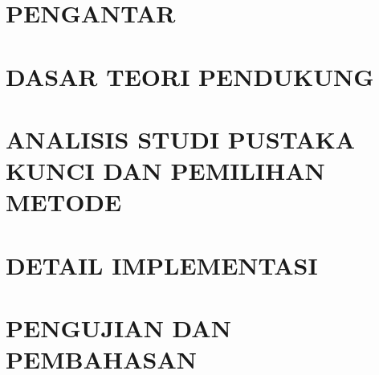 \documentclass{DTETI_CP_C501}
\begin{document}

\maketitle


\chapter{\texorpdfstring{\uppercase{Pengantar}}{PENGANTAR}}
\label{chap:Pengantar}


\chapter{\texorpdfstring{\uppercase{Dasar Teori Pendukung}}{DASAR TEORI PENDUKUNG}}
\label{chap:Dasar_Teori_Pendukung}


\chapter{\texorpdfstring{\uppercase{Analisis Studi Pustaka Kunci dan Pemilihan Metode}}{ANALISIS STUDI PUSTAKA KUNCI DAN PEMILIHAN METODE}}
\label{chap:Analisis_Studi_Pustaka_Kunci_Pemilihan_Metode}


\chapter{\texorpdfstring{\uppercase{Detail Implementasi}}{DETAIL IMPLEMENTASI}}
\label{chap:Detail_Implementasi}


\chapter{\texorpdfstring{\uppercase{Pengujian dan Pembahasan}}{PENGUJIAN DAN PEMBAHASAN}}
\label{chap:Pengujian_Improvement_dan_Pembahasan}


\end{document}

